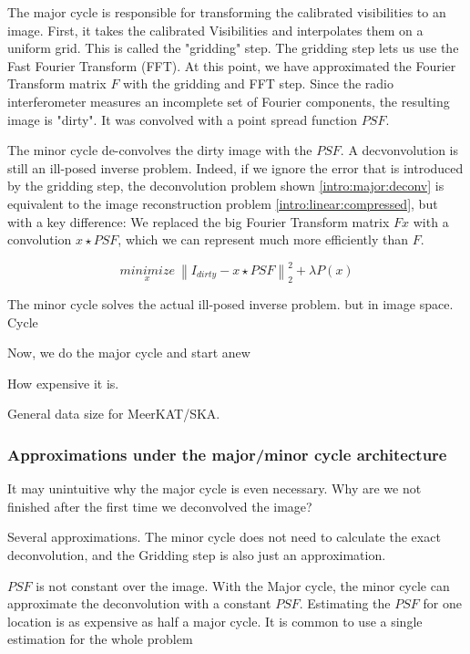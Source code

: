 The major cycle is responsible for transforming the calibrated visibilities to an image. First, it takes the calibrated Visibilities and interpolates them on a uniform grid. This is called the "gridding" step. The gridding step lets us use the Fast Fourier Transform (FFT). At this point, we have approximated the Fourier Transform matrix $F$ with the gridding and FFT step. Since the radio interferometer measures an incomplete set of Fourier components, the resulting image is "dirty". 
It was convolved with a point spread function $PSF$. 

The minor cycle de-convolves the dirty image with the $PSF$. A decvonvolution is still an ill-posed inverse problem. Indeed, if we ignore the error that is introduced by the gridding step, the deconvolution problem shown \eqref{intro:major:deconv} is equivalent to the image reconstruction problem \eqref{intro:linear:compressed}, but with a key difference: We replaced the big Fourier Transform matrix $Fx$ with a convolution $x \star PSF$, which we can represent much more efficiently than $F$.

\begin{equation}\label{intro:major:deconv}
\underset{x}{minimize} \: \left \| I_{dirty} - x \star PSF \right \|_2^2 + \lambda P(x)
\end{equation}

The minor cycle solves the actual ill-posed inverse problem. but in image space. Cycle 

Now, we do the major cycle and start anew

How expensive it is.

General data size for MeerKAT/SKA.

\subsubsection{Approximations under the major/minor cycle architecture} \label{intro:cycles}
It may unintuitive why the major cycle is even necessary. Why are we not finished after the first time we deconvolved the image?

Several approximations. The minor cycle does not need to calculate the exact deconvolution, and the Gridding step is also just an approximation.

$PSF$ is not constant over the image. With the Major cycle, the minor cycle can approximate the deconvolution with a constant $PSF$. Estimating the $PSF$ for one location is as expensive as half a major cycle. It is common to use a single estimation for the whole problem

